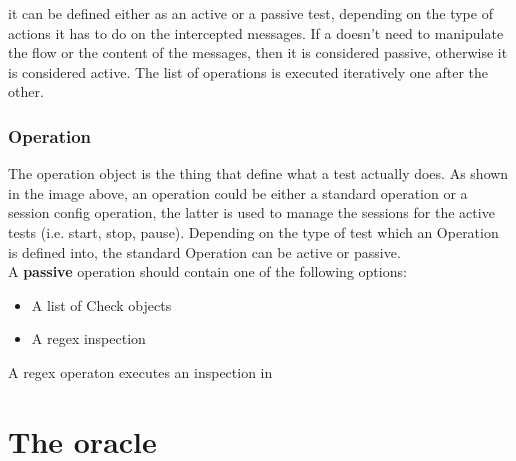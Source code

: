 it can be defined either as an active or a passive test, depending on the type of actions it has to do on the intercepted messages. If a doesn't need to manipulate the flow or the content of the messages, then it is considered passive, otherwise it is considered active.
The list of operations is executed iteratively one after the other.

\subsubsection{Operation}
The operation object is the thing that define what a test actually does. As shown in the image above, an operation could be either a standard operation or a session config operation, the latter is used to manage the sessions for the active tests (i.e. start, stop, pause). Depending on the type of test which an Operation is defined into, the standard Operation can be active or passive.
\\A \textbf{passive} operation should contain one of the following options:
\begin{itemize}
    \item A list of Check objects
    \item A regex inspection
\end{itemize}
A regex operaton executes an inspection in


\section{The oracle}


